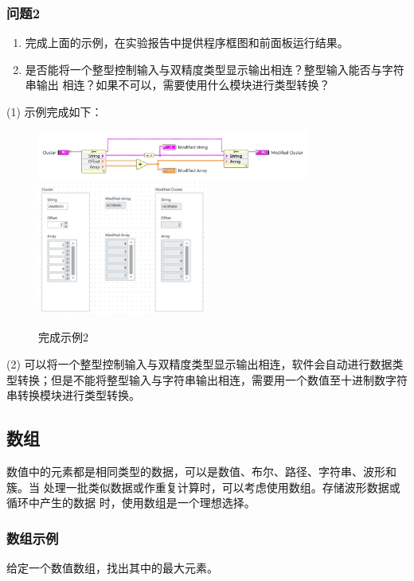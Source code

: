 \documentclass{../source/Experiment}
\begin{document}
\subsubsection{问题2}
\begin{enumerate}
    \item 完成上面的示例，在实验报告中提供程序框图和前面板运行结果。
    \item 是否能将一个整型控制输入与双精度类型显示输出相连？整型输入能否与字符串输出
          相连？如果不可以，需要使用什么模块进行类型转换？
\end{enumerate}
(1)  示例完成如下：

\begin{figure}[H]
    \centering
    \includegraphics[width = 0.8\textwidth]{lab8/lab1-3-a.jpg}
    \includegraphics[width = 0.5\textwidth]{lab8/lab1-3-b.jpg}
    \caption{完成示例2}
\end{figure}

(2)  可以将一个整型控制输入与双精度类型显示输出相连，软件会自动进行数据类型转换；但是不能将整型输入与字符串输出相连，需要用一个数值至十进制数字符串转换模块进行类型转换。

\subsection{数组}
数值中的元素都是相同类型的数据，可以是数值、布尔、路径、字符串、波形和簇。当
处理一批类似数据或作重复计算时，可以考虑使用数组。存储波形数据或循环中产生的数据
时，使用数组是一个理想选择。
\subsubsection{数组示例}
给定一个数值数组，找出其中的最大元素。
\end{document}
